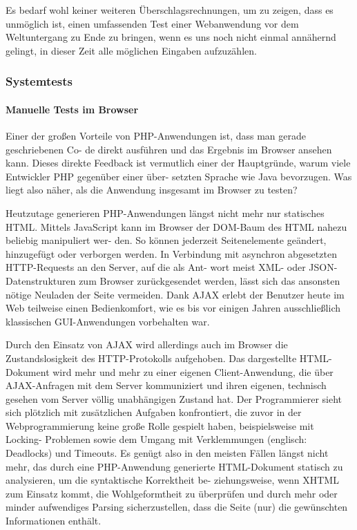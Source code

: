 Es bedarf wohl keiner weiteren Überschlagsrechnungen, um zu zeigen, dass es unmöglich 
ist, einen umfassenden Test einer Webanwendung vor dem Weltuntergang zu Ende zu bringen, 
wenn es uns noch nicht einmal annähernd gelingt, in dieser Zeit alle möglichen
Eingaben aufzuzählen.

\subsubsection{Systemtests}
\paragraph{Manuelle Tests im Browser}
Einer der großen Vorteile von PHP-Anwendungen ist, dass man gerade geschriebenen Co-
de direkt ausführen und das Ergebnis im Browser ansehen kann. Dieses direkte Feedback
ist vermutlich einer der Hauptgründe, warum viele Entwickler PHP gegenüber einer über-
setzten Sprache wie Java bevorzugen. Was liegt also näher, als die Anwendung insgesamt
im Browser zu testen?

Heutzutage generieren PHP-Anwendungen längst nicht mehr nur statisches HTML. Mittels
JavaScript kann im Browser der DOM-Baum des HTML nahezu beliebig manipuliert wer-
den. So können jederzeit Seitenelemente geändert, hinzugefügt oder verborgen werden.
In Verbindung mit asynchron abgesetzten HTTP-Requests an den Server, auf die als Ant-
wort meist XML- oder JSON-Datenstrukturen zum Browser zurückgesendet werden, lässt
sich das ansonsten nötige Neuladen der Seite vermeiden. Dank AJAX erlebt der Benutzer
heute im Web teilweise einen Bedienkomfort, wie es bis vor einigen Jahren ausschließlich
klassischen GUI-Anwendungen vorbehalten war.

Durch den Einsatz von AJAX wird allerdings auch im Browser die Zustandslosigkeit des
HTTP-Protokolls aufgehoben. Das dargestellte HTML-Dokument wird mehr und mehr zu
einer eigenen Client-Anwendung, die über AJAX-Anfragen mit dem Server kommuniziert
und ihren eigenen, technisch gesehen vom Server völlig unabhängigen Zustand hat. Der
Programmierer sieht sich plötzlich mit zusätzlichen Aufgaben konfrontiert, die zuvor in
der Webprogrammierung keine große Rolle gespielt haben, beispielsweise mit Locking-
Problemen sowie dem Umgang mit Verklemmungen (englisch: Deadlocks) und Timeouts.
Es genügt also in den meisten Fällen längst nicht mehr, das durch eine PHP-Anwendung
generierte HTML-Dokument statisch zu analysieren, um die syntaktische Korrektheit be-
ziehungsweise, wenn XHTML zum Einsatz kommt, die Wohlgeformtheit zu überprüfen
und durch mehr oder minder aufwendiges Parsing sicherzustellen, dass die Seite (nur) die
gewünschten Informationen enthält.

